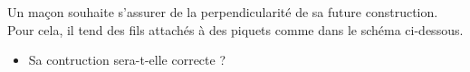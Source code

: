 \documentclass[exercice]{thedocument}%
\begin{document}
%
Un maçon souhaite s'assurer de la perpendicularité de sa future
construction. Pour cela, il tend des fils attachés à des piquets comme dans
le schéma ci-dessous.
\begin{center}
\end{center}
\begin{itemize}
    \item Sa contruction sera-t-elle correcte ?
\end{itemize}
\end{document}
